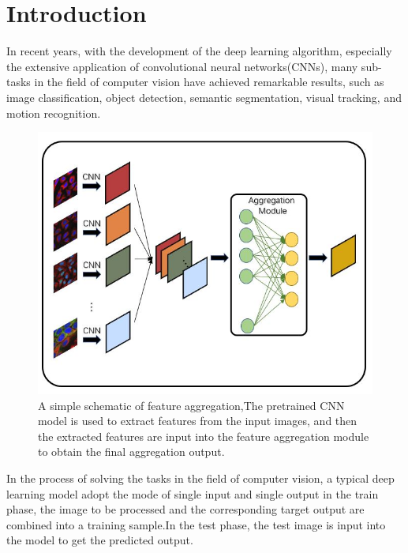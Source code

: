 \documentclass[10pt,twocolumn,letterpaper]{article}
\begin{document}
\section{Introduction}

In recent years, with the development of the deep learning algorithm, especially the extensive application of convolutional neural networks(CNNs), many sub-tasks in the field of computer vision have achieved remarkable results, such as image classification\cite{ref1, ref2, ref3}, object detection\cite{ref4, ref5}, semantic segmentation\cite{ref6, ref7}, visual tracking\cite{ref8}, and motion recognition\cite{ref9, ref10}.

\begin{figure}[t]
\begin{center}
  \includegraphics[width=0.8\linewidth]{figure1.JPG}
\end{center}
   \caption{A simple schematic of feature aggregation,The pretrained CNN model is used to extract features from the input images, and then the extracted features are input into the feature aggregation module to obtain the final aggregation output. }
\label{fig:long}
\label{fig:onecol}
\end{figure}

In the process of solving the tasks in the field of computer vision, a typical deep learning model adopt the mode of single input and single output in the train phase, the image to be processed and the corresponding target output are combined into a training sample.In the test phase, the test image is input into the model to get the predicted output.
\end{document}
